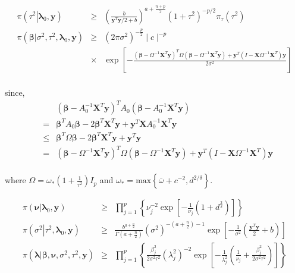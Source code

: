 \documentclass[noinfoline,11pt]{imsart}
\numberwithin{equation}{section}
\theoremstyle{plain}
\newcommand{\y}{\mathbf{y}}
\newcommand{\X}{\mathbf{X}}
\newcommand{\bl}{\boldsymbol{\lambda}}
\begin{document}
\begin{eqnarray*}
\pi\left(\left.\tau^2\right|\bl_0,\y\right) &\geq& \left(\frac{b}{\y^T\y/2+b}\right)^{a+\frac{n+p}{2}}\left(1+\tau^2\right)^{-p/2}\pi_\tau\left(\tau^2\right)\nonumber \\
\pi\left(\left.\boldsymbol{\beta}\right|\sigma^2,\tau^2,\bl_0,\y\right) &\geq& \left(2\pi\sigma^2\right)^{-\frac{p}{2}}\mid c\mid ^{-p} \\
\qquad \qquad &\times&  \exp{\left[-\frac{\left(\boldsymbol{\beta}-\Omega^{-1}\X^T\y\right)^T \Omega\left(\boldsymbol{\beta}-\Omega^{-1}\X^T\y\right)+\y^T\left(I-\X \Omega^{-1}\X^T\right)\y}{2\sigma^2}\right]}\nonumber \\
\end{eqnarray*}

\noindent

since, \begin{eqnarray*}
    & & \left(\boldsymbol{\beta}-A_0^{-1}\X^T\y\right)^T A_0\left(\boldsymbol{\beta}-A_0^{-1}\X^T\y\right) \nonumber \\
    &=& \boldsymbol{\beta}^T A_0\boldsymbol{\beta}-2\boldsymbol{\beta}^T\X^T\y+\y^T\X A_0^{-1}\X^T\y\nonumber \\
    &\leq& \boldsymbol{\beta}^T \Omega\boldsymbol{\beta}-2\boldsymbol{\beta}^T\X^T\y+\y^T\y\nonumber \\
    &=&\left(\boldsymbol{\beta}-\Omega^{-1}\X^T\y\right)^T \Omega\left(\boldsymbol{\beta}-\Omega^{-1}\X^T\y\right)+\y^T\left(I-\X \Omega^{-1}\X^T\right)\y\nonumber \\
\end{eqnarray*}

\noindent
where $\Omega=\omega_*\left(1+\frac{1}{\tau^2}\right)I_p$ and $\omega_*=\text{max}\left\{\bar \omega +c^{-2},d^{2/\delta}\right\}$.

\begin{eqnarray} \label{lowerboundsnishimurahs}
\pi\left(\left.\boldsymbol{\nu}\right|\bl_0,\y\right)&\geq& \prod\limits_{j=1}^p\left\{\nu_j^{-2}\exp{\left[-\frac{1}{\nu_j}\left(1+d^{\frac{2}{\delta}}\right)\right]}\right\}\nonumber \\
\pi\left(\left.\sigma^2\right|\tau^2,\bl_0,\y\right)&\geq& \frac{b^{a+\frac{n}{2}}}{\Gamma\left(a+\frac{n}{2}\right)}\left(\sigma^2\right)^{-\left(a+\frac{n}{2}\right)-1}\exp{\left[-\frac{1}{\sigma^2}\left(\frac{\y^T\y}{2}+b\right)\right]}\nonumber \\
\pi\left(\left.\bl\right|\boldsymbol{\beta,\nu},\sigma^2,\tau^2,\y\right) &\geq&  \prod_{j=1}^p\left\{\frac{\beta_j^2}{2\sigma^2\tau^2}\left(\lambda_j^2\right)^{-2}\exp{\left[-\frac{1}{\lambda_j^2}\left(\frac{1}{\nu_j}+\frac{\beta_j^2}{2\sigma^2\tau^2}\right)\right]}\right\} \nonumber \\
\end{eqnarray}
\end{document}

